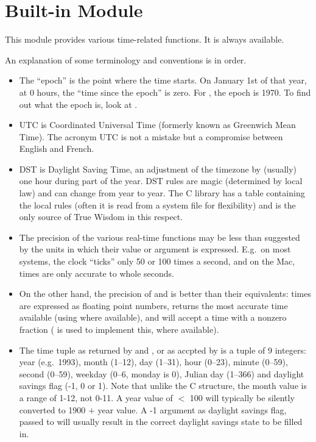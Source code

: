 \section{Built-in Module }
\label{module-time}

This module provides various time-related functions.
It is always available.

An explanation of some terminology and conventions is in order.

\begin{itemize}

\item
The ``epoch'' is the point where the time starts.  On January 1st of that
year, at 0 hours, the ``time since the epoch'' is zero.  For \UNIX{}, the
epoch is 1970.  To find out what the epoch is, look at .

\item
UTC is Coordinated Universal Time (formerly known as Greenwich Mean
Time).  The acronym UTC is not a mistake but a compromise between
English and French.

\item
DST is Daylight Saving Time, an adjustment of the timezone by
(usually) one hour during part of the year.  DST rules are magic
(determined by local law) and can change from year to year.  The C
library has a table containing the local rules (often it is read from
a system file for flexibility) and is the only source of True Wisdom
in this respect.

\item
The precision of the various real-time functions may be less than
suggested by the units in which their value or argument is expressed.
E.g.\ on most \UNIX{} systems, the clock ``ticks'' only 50 or 100 times a
second, and on the Mac, times are only accurate to whole seconds.

\item
On the other hand, the precision of  and 
is better than their \UNIX{} equivalents: times are expressed as floating
point numbers,  returns the most accurate time available
(using \UNIX{}  where available), and 
will accept a time with a nonzero fraction (\UNIX{}  is
used to implement this, where available).

\item
The time tuple as returned by  and ,
or as accpted by  is a tuple of 9
integers: year (e.g.\ 1993), month (1--12), day (1--31), hour
(0--23), minute (0--59), second (0--59), weekday (0--6, monday is 0),
Julian day (1--366) and daylight savings flag (-1, 0  or 1).
Note that unlike the C structure, the month value is a range of 1-12, not
0-11.  A year value of $<$ 100 will typically be silently converted to
1900 $+$ year value.  A -1 argument as daylight savings flag, passed to
 will usually result in the correct daylight savings
state to be filled in.


\end{itemize}

